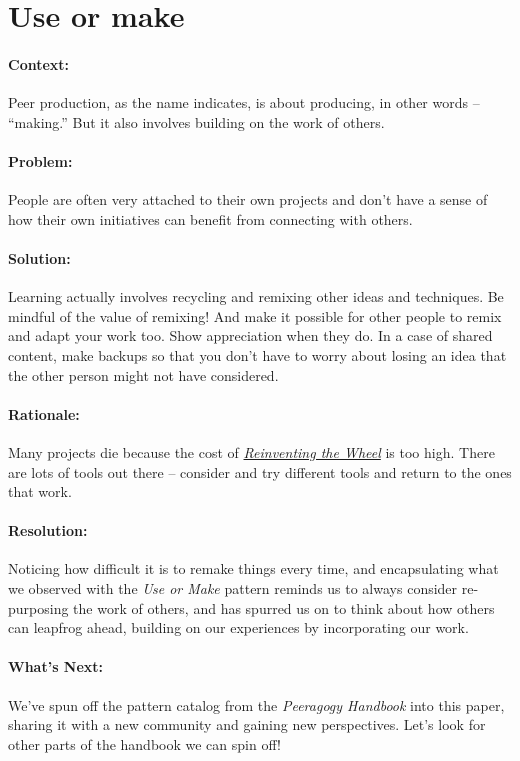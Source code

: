 \section{Use or make}
\paragraph{Context:}
Peer production, as the name indicates, is about producing, in other words --
``making.'' But it also involves building on the work of others.

\paragraph{Problem:}
People are often very attached to their own projects and don't have a sense of how their own initiatives can benefit from connecting with others.

\paragraph{Solution:} Learning actually involves recycling and remixing other ideas and techniques. Be mindful of the value of remixing!  And make it possible for other people to remix and adapt your work too.  Show appreciation when they do.  In a case of shared content, make backups so that you don't have to worry about losing an idea that the other person might not have considered.

\paragraph{Rationale:} 
Many projects die because the cost of \emph{\href{http://c2.com/cgi/wiki?ReinventingTheWheel}{Reinventing the Wheel}} is too high.  There are lots of tools out there -- consider and try different tools and return to the ones that work.

\paragraph{Resolution:} Noticing how difficult it is to remake things every time, and encapsulating what we observed with the \emph{Use or Make} pattern reminds us to always consider re-purposing the work of others, and has spurred us on to think about how others can leapfrog ahead, building on our experiences by incorporating our work.

\paragraph{What's Next:} We've spun off the pattern catalog from the \emph{Peeragogy Handbook} into this paper, sharing it with a new community and gaining new perspectives.  Let's look for other parts of the handbook we can spin off!

